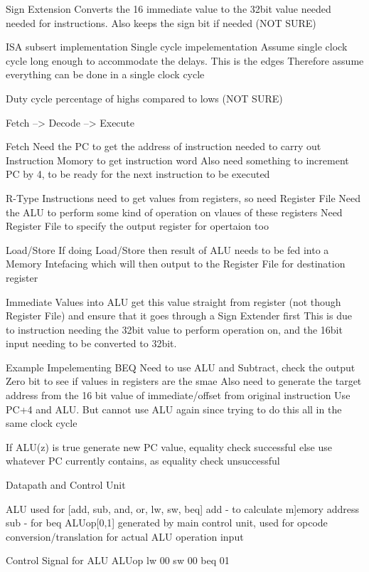 \documentclass{article}
\begin{document}
		Sign Extension
			Converts the 16 immediate value to the 32bit value needed needed for instructions. Also keeps the sign bit if needed (NOT SURE)

	ISA subsert implementation
		Single cycle impelementation
			Assume single clock cycle long enough to accommodate the delays. This is the edges
			Therefore assume everything can be done in a single clock cycle

			Duty cycle
				percentage of highs compared to lows (NOT SURE)

		Fetch --> Decode --> Execute

		Fetch
			Need the PC to get the address of instruction needed to carry out
			Instruction Momory to get instruction word
			Also need something to increment PC by 4, to be ready for the next instruction to be executed

		R-Type Instructions
			need to get values from registers, so need Register File
			Need the ALU to perform some kind of operation on vlaues of these registers 
			Need Register File to specify the output register for opertaion too

		Load/Store
			If doing Load/Store then result of ALU needs to be fed into a Memory Intefacing which will then output to the Register File for destination register

		Immediate Values into ALU
			get this value straight from register (not though Register File) and ensure that it goes through a Sign Extender first
			This is due to instruction needing the 32bit value to perform operation on, and the 16bit input needing to be converted to 32bit.


	Example
		Impelementing BEQ
			Need to use ALU and Subtract, check the output Zero bit to see if values in registers are the smae
			Also need to generate the target address from the 16 bit value of immediate/offset from original instruction
				Use PC+4 and ALU. But cannot use ALU again since trying to do this all in the same clock cycle

			If ALU(z) is true
				generate new PC value, equality check successful
			else
				use whatever PC currently contains, as equality check unsuccessful

	Datapath and Control Unit

		ALU used for [add, sub, and, or, lw, sw, beq]
		add - to calculate m]emory address
		sub - for beq
		ALUop[0,1] generated by main control unit, used for opcode conversion/translation for actual ALU operation input

	Control Signal for ALU
			ALUop	
		lw	00
		sw	00
		beq	01
		
\end{document}
